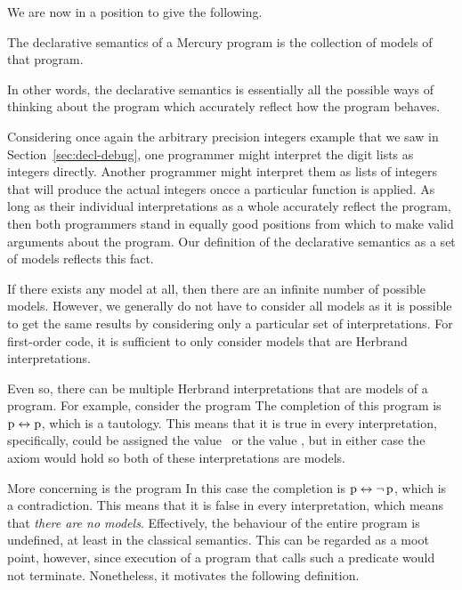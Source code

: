 We are now in a position to give the following.

\begin{definition}
\label{def:declarative-semantics}
The declarative semantics of a Mercury program
is the collection of models of that program.
\end{definition}

\noindent
In other words,
the declarative semantics is essentially
all the possible ways of thinking about the program
which accurately reflect how the program behaves.

Considering once again
the arbitrary precision integers example
that we saw in Section~\ref{sec:decl-debug},
one programmer might interpret the digit lists as integers directly.
Another programmer might interpret them as
lists of integers that will produce
the actual integers oncce a particular function is applied.
As long as their individual interpretations as a whole
accurately reflect the program,
then both programmers stand in equally good positions
from which to make valid arguments about the program.
Our definition of the declarative semantics as a set of models
reflects this fact.

If there exists any model at all,
then there are an infinite number of possible models.
However, we generally do not have to consider all models
as it is possible to get the same results
by considering only a particular set of interpretations.
For first-order code,
it is sufficient to only consider models
that are Herbrand interpretations.

Even so, there can be multiple Herbrand interpretations
that are models of a program.
For example, consider the program 
The completion of this program is $\operatorname{p} \leftrightarrow \operatorname{p}$,
which is a tautology.
This means that it is true in every interpretation,
specifically,
 could be assigned the value \true\ or the value \false,
but in either case the axiom would hold
so both of these interpretations are models.

More concerning is the program 
In this case the completion is $\operatorname{p} \leftrightarrow \lnot \operatorname{p}$,
which is a contradiction.
This means that it is false in every interpretation,
which means that \emph{there are no models}.
Effectively, the behaviour of the entire program is undefined,
at least in the classical semantics.
This can be regarded as a moot point, however,
since execution of a program that calls such a predicate would not terminate.
Nonetheless, it motivates the following definition.

